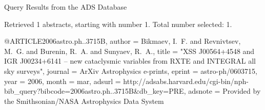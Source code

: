 Query Results from the ADS Database


Retrieved 1 abstracts, starting with number 1.  Total number selected: 1.

@ARTICLE{2006astro.ph..3715B,
   author = {{Bikmaev}, I.~F. and {Revnivtsev}, M.~G. and {Burenin}, R.~A. and 
	{Sunyaev}, R.~A.},
    title = "{XSS J00564+4548 and IGR J00234+6141 -- new cataclysmic variables from RXTE and INTEGRAL all sky surveys}",
  journal = {ArXiv Astrophysics e-prints},
   eprint = {astro-ph/0603715},
     year = 2006,
    month = mar,
   adsurl = {http://adsabs.harvard.edu/cgi-bin/nph-bib_query?bibcode=2006astro.ph..3715B&db_key=PRE},
  adsnote = {Provided by the Smithsonian/NASA Astrophysics Data System}
}


